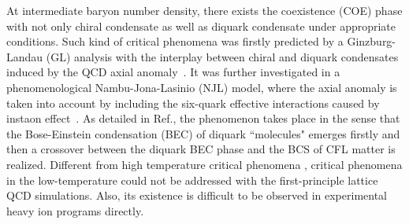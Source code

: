 \documentclass[prd, showpacs,nofootinbib,amsmath,amssymb,12pt]{revtex4}
\begin{document}
At intermediate baryon number density, there exists the coexistence (COE) phase with not only chiral condensate as well as diquark condensate under appropriate conditions.
Such kind of critical phenomena was firstly predicted by a Ginzburg-Landau (GL) analysis with the interplay between chiral and
diquark condensates induced by the QCD axial anomaly~\cite{yamamoto2007phase}.
It was further investigated in a phenomenological Nambu-Jona-Lasinio (NJL) model,
where the axial anomaly is taken into account by including the  six-quark effective interactions
caused by instaon effect~\cite{abuki2010nambu}.
As detailed in Ref.\cite{abuki2010nambu},
the phenomenon takes place in the sense that the Bose-Einstein condensation (BEC) of diquark ``molecules" emerges firstly
and then a crossover between the diquark BEC phase and the BCS of CFL matter is realized.
Different from high temperature critical phenomena \cite{Shuryak2017Strongly}, critical phenomena in the low-temperature could not be addressed with the first-principle lattice QCD simulations.
Also, its existence is difficult to be observed in experimental heavy ion programs directly.
\end{document}
